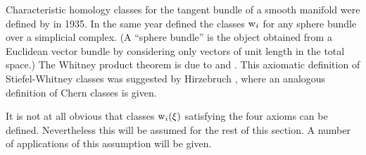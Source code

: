 \documentclass[../main]{subfiles}
\begin{document}
\begin{remark}
Characteristic homology classes for the tangent bundle of a smooth manifold were defined by \cite{stiefel1936} in 1935. In the same year \cite{whitney1936} defined the classes $\operatorname{w}_i$ for any sphere bundle over a simplicial complex. (A ``sphere bundle'' is the object obtained from a Euclidean vector bundle by considering only vectors of unit length in the total space.) The Whitney product theorem is due to \cite{whitneysphere1940, whitneydiffman1941} and \cite{wu1948}. This axiomatic definition of Stiefel-Whitney classes was suggested by Hirzebruch \cite[p. 58]{hirzebruchalggeo1966}, where an analogous definition of Chern classes is given.
\end{remark}


It is not at all obvious that classes $\operatorname{w}_i(\xi)$ satisfying the four axioms can be defined. Nevertheless this will be assumed for the rest of this section. A number of applications of this assumption will be given.
\end{document}
